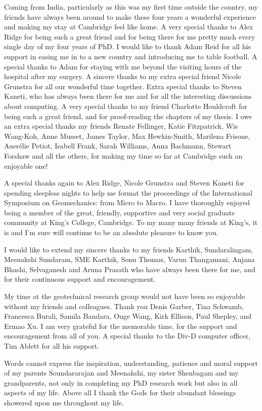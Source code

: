 \begin{acknowledgements}
Coming from India, particularly as this was my first time outside the country, 
my friends have always been around to make these four years a wonderful 
experience and making my stay at Cambridge feel like home. A very special 
thanks to Alex Ridge for being such a great friend 
and for being there for me pretty much every single day of my four years of 
PhD. I would like to thank Adam Reid for all his support in easing me in to a 
new country and introducing me to table football. A special thanks to Adam for 
staying with me beyond the visiting hours of the hospital after my surgery. A 
sincere thanks to my extra special friend Nicole Grunstra for all our 
wonderful time together. Extra special thanks to Steven Kaneti, who has always 
been there for me and for all the interesting discussions about computing. A 
very special thanks to my friend Charlotte Houldcroft for being such a great 
friend, and for proof-reading the chapters of my thesis. I owe 
an extra special thanks my friends Renate Fellinger, Katie Fitzpatrick, Wis Wang-Koh, Anne Musset, James Taylor, Max Hewkin-Smith, Marilena Frisone, Auer\'{e}lie Petiot, Isabell Frank, Sarah Williams, Anna Bachmann, Stewart Forshaw and all the others, for making my time so far at Cambridge such an 
enjoyable one!

A special thanks again to Alex Ridge, Nicole Grunstra and Steven Kaneti for 
spending sleepless nights to help me format the proceedings of the 
International Symposium on Geomechanics: from Micro to Macro. 
I have thoroughly enjoyed being a member of the great, friendly, supportive and 
very social graduate community at King's College, Cambridge. To my many many 
friends at King's, it is and I'm sure will continue to be an absolute pleasure 
to know you.

I would like to extend my sincere thanks to my friends Karthik, Sundaralingam, Meenakshi Sundaram, SME Karthik, Sonu Thomas, Varun Thangamani, Anjana Bhashi,  Selvaganesh and Aruna Prasath who have always been there for me, and for their continuous support and encouragement. 

My time at the geotechnical research group would not have been so enjoyable 
without my friends and colleagues. Thank you Denis Garber, Tina Schwamb, 
Francesca Burali, Samila Bandara, Ouge Wang, Kirk Ellison, Paul 
Shepley, and Ermao Xu. I am very grateful for the memorable time, 
for the support and encouragement from all of you. A special thanks to the 
Div-D computer officer, Tim Ablett for all his support.

Words cannot express the inspiration, understanding, patience and moral support 
of my parents Soundararajan and Meenakshi, my sister Shenbagam and my 
grandparents, not only in completing my PhD research work but also in all 
aspects of my life. Above all I thank the Gods for their abundant blessings 
showered upon me throughout my life.


\end{acknowledgements}
